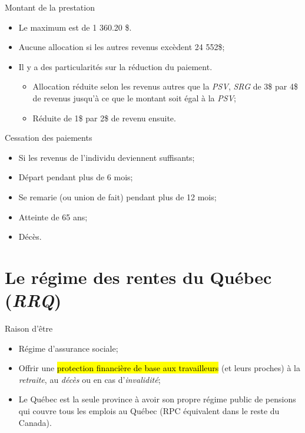 \documentclass[10pt, french]{article}
\begin{document}
\begin{multicols*}{3}
\begin{conceptgen}{Montant de la prestation}
\begin{itemize}[leftmargin = *]
	\item	Le maximum est de 1 360.20 \$.
	\item	Aucune allocation si les autres revenus excèdent 24 552\$;
	\item	Il y a des particularités sur la réduction du paiement.
		\begin{itemize}[leftmargin = *]
		\item   Allocation réduite selon les revenus autres que la \textit{PSV}, \textit{SRG} de 3\$ par 4\$ de revenus jusqu'à ce que le montant soit égal à la \textit{PSV};
		\item   Réduite de 1\$ par 2\$ de revenu ensuite. 
		\end{itemize}
\end{itemize}
\end{conceptgen}

\begin{conceptgen}{Cessation des paiements}
\begin{itemize}[leftmargin = *]
	\item	Si les revenus de l'individu deviennent suffisants;
	\item 	Départ pendant plus de 6 mois;
	\item	Se remarie (ou union de fait) pendant plus de 12 mois;
	\item 	Atteinte de 65 ans;
	\item	Décès.
\end{itemize}
\end{conceptgen}



\newpage

\section{Le régime des rentes du Québec (\textit{RRQ})}

\begin{conceptgen}{Raison d'être}
\begin{itemize}[leftmargin = *]
	\item	Régime d'assurance sociale;
	\item	Offrir une \hl{protection financière de base aux travailleurs} (et leurs proches) à la \textit{retraite}, au \textit{décès} ou en cas d'\textit{invalidité};
	\item	Le \textcolor{blue(pigment)}{Québec} est la seule province à avoir son propre régime public de pensions qui couvre tous les emplois au \textcolor{blue(pigment)}{Québec} (RPC équivalent dans le reste du \textcolor{bulgarianrose}{Canada}).
\end{itemize}


\end{conceptgen}
\end{multicols*}
\end{document}
